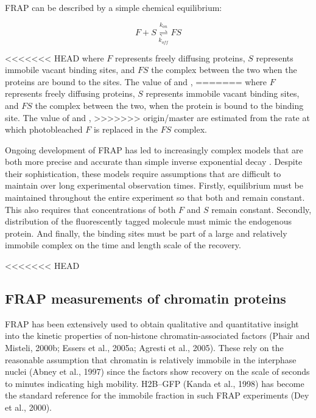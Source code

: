     FRAP can be described by a simple chemical equilibrium:

    \begin{displaymath}
      F + S \overset{k_{on}}{\underset{k_{off}}{\rightleftharpoons}} FS
    \end{displaymath}

<<<<<<< HEAD
    where $F$ represents freely diffusing proteins, 
    $S$ represents immobile vacant binding sites, 
    and $FS$ the complex between the two when the proteins are bound to the sites. 
    The value of \Kon{} and \Koff{},
=======
    where $F$ represents freely diffusing proteins, $S$ represents immobile vacant
    binding sites, and $FS$ the complex between the two, when the protein is bound
    to the binding site. The value of \Kon{} and \Koff{},
>>>>>>> origin/master
    are estimated from the rate at which photobleached $F$ is replaced in the $FS$ complex.

    Ongoing development of FRAP has led to increasingly complex models
    that are both more precise and accurate than simple
    inverse exponential decay \citep{mcnally-frap-2010}.
    Despite their sophistication, these models require assumptions
    that are difficult to maintain over long experimental observation times.
    Firstly, equilibrium must be maintained throughout the entire experiment 
    so that both \Kon{} and \Koff{} remain constant.
    This also requires that concentrations of both $F$ and $S$ remain constant.
    Secondly, distribution of the fluorescently tagged molecule must mimic the endogenous protein.
    And finally, the binding sites must be part of a large and relatively immobile complex
    on the time and length scale of the recovery.

<<<<<<< HEAD
  \subsection{FRAP measurements of chromatin proteins}

    FRAP has been extensively used to obtain qualitative and quantitative insight 
    into the kinetic properties of non-histone chromatin-associated factors 
    (Phair and Misteli, 2000b; Essers et al., 2005a; Agresti et al., 2005). 
    These rely on the reasonable assumption that chromatin is 
    relatively immobile in the interphase nuclei (Abney et al., 1997)
    since the factors show recovery on the scale of seconds to minutes indicating high mobility.
    H2B–GFP (Kanda et al., 1998) has become the standard reference 
    for the immobile fraction in such FRAP experiments (Dey et al., 2000).

